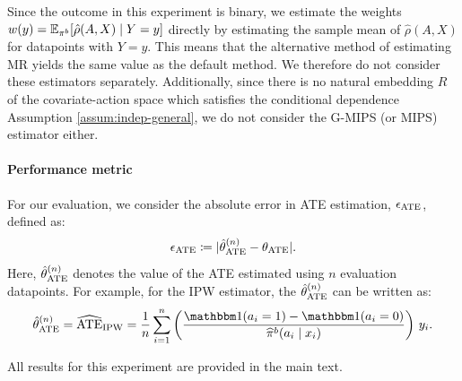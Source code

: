Since the outcome in this experiment is binary, we estimate the weights $w(y) = \mathbb{E}_{\pi^b}[\hat{\rho}(A, X)\mid Y=y]$ directly by estimating the sample mean of $\hat{\rho}(A, X)$ for datapoints with $Y=y$. This means that the alternative method of estimating MR yields the same value as the default method. We therefore do not consider these estimators separately. Additionally, since there is no natural embedding $R$ of the covariate-action space which satisfies the conditional dependence Assumption \ref{assum:indep-general}, we do not consider the G-MIPS (or MIPS) estimator either.   


\paragraph{Performance metric}
For our evaluation, we consider the absolute error in ATE estimation, $\epsilon_{\textup{ATE}}$, defined as:
\[
\epsilon_{\textup{ATE}} \coloneqq | \hat{\theta}^{(n)}_{\textup{ATE}} - \theta_{\textup{ATE}} |.
\]
Here, $\hat{\theta}^{(n)}_{\textup{ATE}}$ denotes the value of the ATE estimated using $n$ evaluation datapoints. For example, for the IPW estimator, the $\hat{\theta}^{(n)}_{\textup{ATE}}$ can be written as:
\[
\hat{\theta}^{(n)}_\ate = \ateipw = \frac{1}{n} \sum_{i=1}^n \left(\frac{\ind(a_i=1)-\ind(a_i=0)}{\hatbeh(a_i\mid x_i)}\right)\, y_i.
\]

All results for this experiment are provided in the main text.

